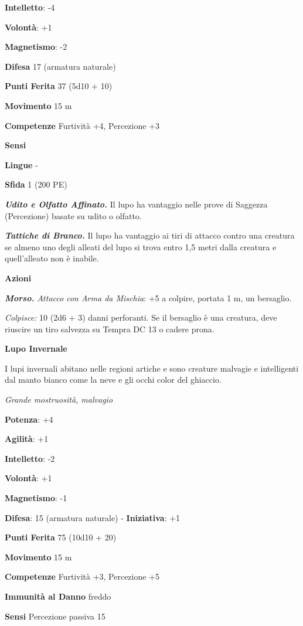 \begin{multicols}{2}
\textbf{Intelletto}: -4

\textbf{Volontà}: +1

\textbf{Magnetismo}: -2

\textbf{Difesa} 17 (armatura naturale)

\textbf{Punti Ferita} 37 (5d10 + 10)

\textbf{Movimento} 15 m

\textbf{Competenze} Furtività +4, Percezione +3

\textbf{Sensi} 

\textbf{Lingue} -

\textbf{Sfida} 1 (200 PE)\smallskip

\emph{\textbf{Udito e Olfatto Affinato.}} Il lupo ha vantaggio nelle
prove di Saggezza (Percezione) basate su udito o olfatto.

\emph{\textbf{Tattiche di Branco.}} Il lupo ha vantaggio ai tiri di
attacco contro una creatura se almeno uno degli alleati del lupo si
trova entro 1,5 metri dalla creatura e quell'alleato non è inabile.

\smallskip\textbf{Azioni}

\emph{\textbf{Morso.} Attacco con Arma da Mischia}: +5 a colpire,
portata 1 m, un bersaglio.

\emph{Colpisce:} 10 (2d6 + 3) danni perforanti. Se il bersaglio è una
creatura, deve riuscire un tiro salvezza su Tempra DC 13 o cadere prona.

\textbf{Lupo Invernale}

I lupi invernali abitano nelle regioni artiche e sono creature malvagie
e intelligenti dal manto bianco come la neve e gli occhi color del
ghiaccio.

\emph{Grande mostruosità, malvagio}

\textbf{Potenza}: +4

\textbf{Agilità}: +1

\textbf{Intelletto}: -2

\textbf{Volontà}: +1

\textbf{Magnetismo}: -1

\textbf{Difesa}: 15 (armatura naturale) - \textbf{Iniziativa}: +1

\textbf{Punti Ferita} 75 (10d10 + 20)

\textbf{Movimento} 15 m

\textbf{Competenze} Furtività +3, Percezione +5

\textbf{Immunità al Danno} freddo

\textbf{Sensi} Percezione passiva 15


\end{multicols}
